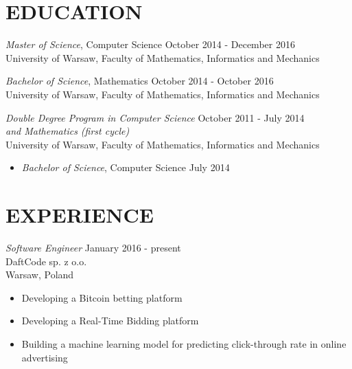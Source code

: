 \documentclass[margin, 10pt]{res} %
\begin{document}
\begin{resume}


\section{EDUCATION}

{\sl Master of Science}, Computer Science \hfill October 2014 - December 2016 \\
University of Warsaw, Faculty of Mathematics, Informatics and Mechanics

{\sl Bachelor of Science}, Mathematics \hfill October 2014 - October 2016\\
University of Warsaw, Faculty of Mathematics, Informatics and Mechanics

{\sl Double Degree Program in Computer Science} \hfill October 2011 - July 2014 \\ {\sl and Mathematics (first cycle)} \\
University of Warsaw, Faculty of Mathematics, Informatics and Mechanics
\begin{itemize}
\item {\sl Bachelor of Science}, Computer Science \hfill July 2014
\end{itemize}
 
\section{EXPERIENCE}

{\sl Software Engineer} \hfill January 2016 - present \\
DaftCode sp. z o.o. \\
Warsaw, Poland

\begin{itemize} \itemsep -2pt %
\item Developing a Bitcoin betting platform
\item Developing a Real-Time Bidding platform
\item Building a machine learning model for predicting click-through rate in online advertising
\end{itemize}


\end{resume}
\end{document}
